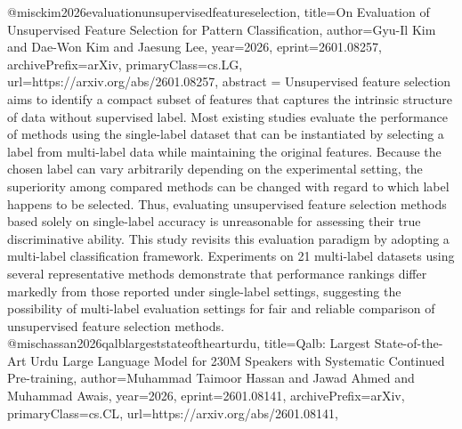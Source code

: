 {}@misc{kim2026evaluationunsupervisedfeatureselection,
      title={On Evaluation of Unsupervised Feature Selection for Pattern Classification}, 
      author={Gyu-Il Kim and Dae-Won Kim and Jaesung Lee},
      year={2026},
      eprint={2601.08257},
      archivePrefix={arXiv},
      primaryClass={cs.LG},
      url={https://arxiv.org/abs/2601.08257},
      abstract = {Unsupervised feature selection aims to identify a compact subset of features that captures the intrinsic structure of data without supervised label. Most existing studies evaluate the performance of methods using the single-label dataset that can be instantiated by selecting a label from multi-label data while maintaining the original features. Because the chosen label can vary arbitrarily depending on the experimental setting, the superiority among compared methods can be changed with regard to which label happens to be selected. Thus, evaluating unsupervised feature selection methods based solely on single-label accuracy is unreasonable for assessing their true discriminative ability. This study revisits this evaluation paradigm by adopting a multi-label classification framework. Experiments on 21 multi-label datasets using several representative methods demonstrate that performance rankings differ markedly from those reported under single-label settings, suggesting the possibility of multi-label evaluation settings for fair and reliable comparison of unsupervised feature selection methods.}
}@misc{hassan2026qalblargeststateofthearturdu,
      title={Qalb: Largest State-of-the-Art Urdu Large Language Model for 230M Speakers with Systematic Continued Pre-training}, 
      author={Muhammad Taimoor Hassan and Jawad Ahmed and Muhammad Awais},
      year={2026},
      eprint={2601.08141},
      archivePrefix={arXiv},
      primaryClass={cs.CL},
      url={https://arxiv.org/abs/2601.08141},
}
